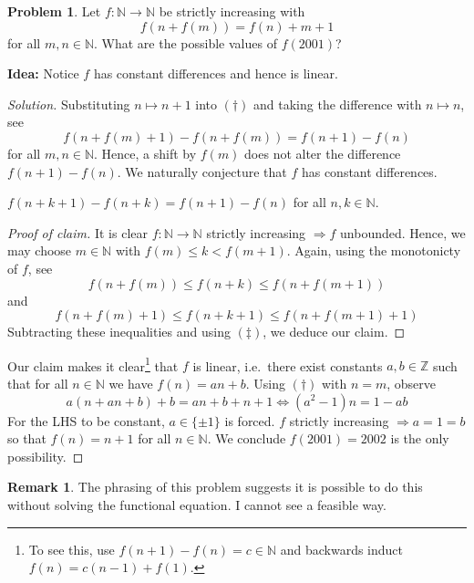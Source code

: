 \documentclass[11pt]{article}
\theoremstyle{definition}
\newtheorem*{problem}{Problem}
\newtheorem*{remark}{Remark}
\begin{document}
\begin{problem}
  Let $f: \mathbb{N} \to \mathbb{N}$ be strictly increasing with 
  \[f(n+f(m)) = f(n) + m + 1 \tag{$\dagger$}\]
  for all $m, n \in \mathbb{N}$. What are the possible values of $f(2001)$? 
\end{problem}

{\bf Idea:} Notice $f$ has constant differences and hence is linear. 

\begin{proof}[Solution]
  Substituting $n \mapsto n + 1$ into $(\dagger)$ and taking the difference with $n \mapsto n$, see
  \[f(n + f(m) + 1) - f(n + f(m)) = f(n+1) - f(n) \tag{$\ddagger$}\]
  for all $m, n \in \mathbb{N}$. Hence, a shift by $f(m)$ does not alter the difference $f(n + 1) - f(n)$. We naturally 
  conjecture that $f$ has constant differences. 
  \begin{claim}
    $f(n+k+1) - f(n+k) = f(n+1) - f(n)$ for all $n, k \in \mathbb{N}$.
  \end{claim}
  \begin{proof}[Proof of claim]
    It is clear $f: \mathbb{N} \to \mathbb{N}$ strictly increasing $\Rightarrow f$ unbounded. Hence, we may choose
    $m \in \mathbb{N}$ with $f(m) \leq k < f(m+1)$. Again, using the monotonicty of $f$, see
    \[f(n + f(m)) \leq f(n + k) \leq f(n + f(m + 1))\]
    and 
    \[f(n + f(m) + 1) \leq f(n + k + 1) \leq f(n + f(m + 1) + 1)\]
    Subtracting these inequalities and using $(\ddagger)$, we deduce our claim. 
  \end{proof}
  Our claim makes it clear\footnote{
    To see this, use $f(n+1) - f(n) = c \in \mathbb{N}$ and backwards induct $f(n) = c(n-1) + f(1)$.
  } that $f$ is linear, i.e.~there exist constants $a, b \in \mathbb{Z}$ such that for all $n \in \mathbb{N}$ 
  we have $f(n) = an + b$. Using $(\dagger)$ with $n = m$, observe 
  \[a(n + an + b) + b = an + b + n + 1 \Longleftrightarrow (a^2 - 1)n = 1 - ab\]
  For the LHS to be constant, $a \in \{\pm 1\}$ is forced. $f$ strictly increasing $\Rightarrow a = 1 = b$ so that 
  $f(n) = n + 1$ for all $n \in \mathbb{N}$. We conclude $f(2001) = 2002$ is the only possibility.
\end{proof}

\begin{remark}
  The phrasing of this problem suggests it is possible to do this without solving the functional equation. I 
  cannot see a feasible way. 
\end{remark}

\newpage 
\end{document}
